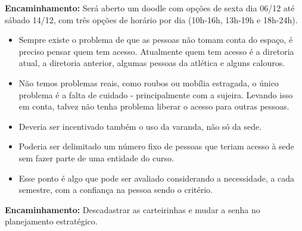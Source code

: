 \documentclass{ata-calico}
\begin{document}
\textbf{Encaminhamento:} Será aberto um doodle com opções de sexta dia 06/12 até sábado 14/12, com três opções de horário por dia (10h-16h, 13h-19h e 18h-24h).

\begin{itemize}
\item Sempre existe o problema de que as pessoas não tomam conta do espaço, é preciso pensar quem tem acesso. Atualmente quem tem acesso é a diretoria atual, a diretoria anterior, algumas pessoas da atlética e alguns calouros.
\item Não temos problemas reais, como roubos ou mobília estragada, o único problema é a falta de cuidado - principalmente com a sujeira. Levando isso em conta, talvez não tenha problema liberar o acesso para outras pessoas.
\item Deveria ser incentivado também o uso da varanda, não só da sede.
\item Poderia ser delimitado um número fixo de pessoas que teriam acesso à sede sem fazer parte de uma entidade do curso.
\item Esse ponto é algo que pode ser avaliado considerando a necessidade, a cada semestre, com a confiança na pessoa sendo o critério.
\end{itemize}

\textbf{Encaminhamento:} Descadastrar as carteirinhas e mudar a senha no planejamento estratégico.

\end{document}
